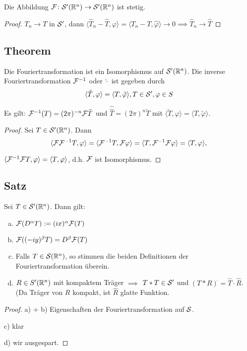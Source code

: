 Die Abbildung $\mathcal{F} \colon \mathcal{S}'(\mathbb{R}^n) \to \mathcal{S}'(\mathbb{R}^n)$ ist stetig.

\begin{proof}
  $T_n \to T$ in $\mathcal{S}'$, dann $\langle \hat T_n - \hat T, \varphi \rangle = \langle T_n - T, \hat \varphi \rangle \to 0 \implies \hat T_n \to \hat T$
\end{proof}

\subsection{Theorem}

Die Fouriertransformation ist ein Isomorphismus auf $\mathcal{S}'(\mathbb{R}^n)$.
Die inverse Fouriertransformation $\mathcal{F}^{-1}$ oder $\check{\cdot}$ ist gegeben durch
$$
\langle \check T, \varphi \rangle = \langle T, \check \varphi \rangle, T \in \mathcal{S}', \varphi \in S
$$

Es gilt: $\mathcal{F}^{-1}(T) = (2\pi)^{-n} \mathcal{F} \tilde T$  und $\hat{\hat T} = (2\pi)^n \tilde T$ mit $\langle \tilde T, \varphi \rangle = \langle T, \tilde \varphi \rangle$.

\begin{proof}
  Sei $T \in \mathcal{S}'(\mathbb{R}^n)$.
  Dann
  $$
  \langle \mathcal{F} \mathcal{F}^{-1} T, \varphi \rangle = \langle \mathcal{F}^{-1} T, \mathcal{F} \varphi \rangle = \langle T, \mathcal{F}^{-1} \mathcal{F} \varphi \rangle = \langle T, \varphi \rangle,
  $$

  $ \langle \mathcal{F}^{-1} \mathcal{F} T, \varphi \rangle = \langle T, \varphi \rangle$, d.h. $\mathcal{F}$ ist Isomorphismus.
\end{proof}

\subsection{Satz}

Sei $T \in \mathcal{S}'(\mathbb{R}^n)$. 
Dann gilt:
\begin{enumerate}[a)]
  \item $\mathcal{F}(D^\alpha T) := (i x )^\alpha \mathcal{F}(T)$
  \item $\mathcal{F}((-iy)^\beta T) = D^\beta \mathcal{F}(T)$
  \item Falls $T \in \mathcal{S}(\mathbb{R}^n)$, so stimmen die beiden Definitionen der Fouriertransformation überein.
  \item $R \in S'(\mathbb{R}^n)$ mit kompaktem Träger $\implies$ $T \ast T \in \mathcal{S}'$ und  $(T \ast R)^{\hat{}} = \hat T \cdot \hat R$. (Da Träger von $R$ kompakt, ist $\hat R$ glatte Funktion.
\end{enumerate}

\begin{proof}
  a) + b) Eigenschaften der Fouriertransformation auf $\mathcal{S}$.
  
  c) klar

  d) wir ausgespart.
\end{proof}

